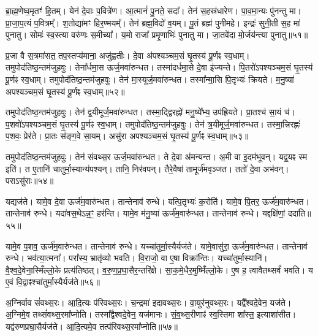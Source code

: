 ब्रा॒ह्म॒णेष्व॒मृतꣳ॑ हि॒तम्।
येन॑ दे॒वाः प॒वित्रे॑ण।
आ॒त्मानं॑ पु॒नते॒ सदा᳚।
तेन॑ स॒हस्र॑धारेण।
पा॒व॒मा॒न्यः पु॑नन्तु मा।
प्रा॒जा॒प॒त्यं प॒वित्रम्᳚।
श॒तोद्या॑मꣳ हिर॒ण्मयम्᳚।
तेन॑ ब्रह्म॒विदो॑ व॒यम्।
पू॒तं ब्रह्म॑ पुनीमहे।
इन्द्रः॑ सुनी॒ती स॒ह मा॑ पुनातु।
सोमः॑ स्व॒स्त्या वरु॑णः स॒मीच्या᳚।
य॒मो राजा᳚ प्रमृ॒णाभिः॑ पुनातु मा।
जा॒तवे॑दा मो॒र्जय॑न्त्या पुनातु॥५१॥\anuvakamend[अनु॑ रयी॒णां ब्रह्म॑णा स्व॒स्त्यय॑नीः सु॒दुघा॒ हि घृ॑त॒श्चुत॒ ऋषि॑भिः॒ सम्भृ॑तो॒ रसः॑ पुनातु॒ त्रीणि॑ च]

प्र॒जा वै स॒त्रमा॑सत॒ तप॒स्तप्य॑माना॒ अजु॑ह्वतीः।
दे॒वा अ॑पश्यञ्चम॒सं घृ॒तस्य॑ पू॒र्णꣴ स्व॒धाम्।
तमुपोद॑तिष्ठ॒न्तम॑\-जुहवुः।
तेना᳚र्धमा॒स ऊर्ज॒मवा॑रुन्धत।
तस्मा॑दर्धमा॒से दे॒वा इ॑ज्यन्ते।
पि॒तरो॑\-ऽपश्यञ्चम॒सं घृ॒तस्य॑ पू॒र्णꣴ स्व॒धाम्।
तमुपोद॑तिष्ठ॒न्तम॑जुहवुः।
तेन॑ मा॒स्यूर्ज॒मवा॑रुन्धत।
तस्मा᳚न्मा॒सि पि॒तृभ्यः॑ क्रियते।
म॒नु॒ष्या॑ अपश्यञ्चम॒सं घृ॒तस्य॑ पू॒र्णꣴ स्व॒धाम्॥५२॥

तमुपोद॑तिष्ठ॒न्तम॑जुहवुः।
तेन॑ द्व॒यीमूर्ज॒मवा॑रुन्धत।
तस्मा॒द्द्विरह्नो॑ मनु॒ष्ये᳚भ्य॒ उप॑ह्रियते।
प्रा॒तश्च॑ सा॒यं च॑।
प॒शवो॑\-ऽपश्यञ्चम॒सं घृ॒तस्य॑ पू॒र्णꣴ स्व॒धाम्।
तमुपोद॑तिष्ठ॒न्त\-म॑जुहवुः।
तेन॑ त्र॒यीमूर्ज॒मवा॑रुन्धत।
तस्मा॒त्त्रिरह्नः॑ प॒शवः॒ प्रेर॑ते।
प्रा॒तः स॑ङ्ग॒वे सा॒यम्।
असु॑रा अपश्यञ्चम॒सं घृ॒तस्य॑ पू॒र्णꣴ स्व॒धाम्॥५३॥

तमुपोद॑तिष्ठ॒न्तम॑जुहवुः।
तेन॑ संवथ्स॒र ऊर्ज॒मवा॑रुन्धत।
ते दे॒वा अ॑मन्यन्त।
अ॒मी वा इ॒दम॑भूवन्।
यद्व॒यꣴ स्म इति॑।
त ए॒तानि॑ चातुर्मा॒स्यान्य॑पश्यन्।
तानि॒ निर॑वपन्।
तैरे॒वैषां तामूर्ज॑मवृञ्जत।
ततो॑ दे॒वा अभ॑वन्।
पराऽसु॑राः॥५४॥

यद्यज॑ते।
यामे॒व दे॒वा ऊर्ज॑म॒वारु॑न्धत।
तान्तेनाव॑ रुन्धे।
यत्पि॒तृभ्यः॑ क॒रोति॑।
यामे॒व पि॒तर॒ ऊर्ज॑म॒वारु॑न्धत।
तान्तेनाव॑ रुन्धे।
यदा॑वस॒थे\-ऽन्न॒ꣳ॒ हर॑न्ति।
यामे॒व म॑नु॒ष्या॑ ऊर्ज॑म॒वारु॑न्धत।
तान्तेनाव॑ रुन्धे।
यद्दक्षि॑णां॒ ददा॑ति॥५५॥

यामे॒व प॒शव॒ ऊर्ज॑म॒वारु॑न्धत।
तान्तेनाव॑ रुन्धे।
यच्चा॑तुर्मा॒स्यैर्\-यज॑ते।
यामे॒वासु॑रा॒ ऊर्ज॑म॒वारु॑न्धत।
तान्तेनाव॑ रुन्धे।
भव॑त्या॒त्मना᳚।
परा᳚स्य॒ भ्रातृ॑व्यो भवति।
वि॒राजो॒ वा ए॒षा विक्रा᳚न्तिः।
यच्चा॑तुर्मा॒स्यानि॑।
वै॒श्व॒दे॒वेना॒स्मिँल्लो॒के प्रत्य॑तिष्ठत्।
व॒रु॒ण॒प्र॒घा॒सैर॒न्तरि॑क्षे।
सा॒क॒मे॒धैर॒मुष्मिँ॑ल्लो॒के।
ए॒ष ह॒ त्वावैतथ्सर्वं॑ भवति।
य ए॒वं वि॒द्वाꣴश्चा॑तुर्मा॒स्यैर्यज॑ते॥५६॥

अ॒ग्निर्वाव सं॑वथ्स॒रः।
आ॒दि॒त्यः प॑रिवथ्स॒रः।
च॒न्द्रमा॑ इदावथ्स॒रः।
वा॒युर॑नुवथ्स॒रः।
यद्वै᳚श्वदे॒वेन॒ यज॑ते।
अ॒ग्निमे॒व तथ्सं॑वथ्स॒रमा᳚प्नोति।
तस्मा᳚द्वैश्वदे॒वेन॒ यज॑मानः।
सं॒व॒थ्स॒रीणाꣴ॑ स्व॒स्तिमा शा᳚स्त॒ इत्याशा॑सीत।
यद्व॑रुण\-प्रघा॒सैर्यज॑ते।
आ॒दि॒त्यमे॒व तत्प॑रिवथ्स॒रमा᳚प्नोति॥५७॥

